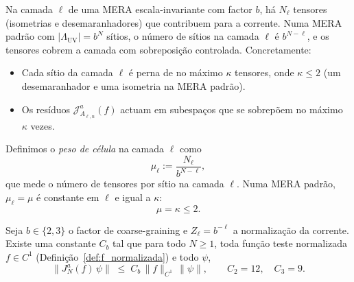 \begin{definition}\label{def:peso_celula}
Na camada $\ell$ de uma MERA escala-invariante com factor $b$, há
$N_\ell$ tensores (isometrias e desemaranhadores) que contribuem
para a corrente. Numa MERA padrão com $|\Lambda_{\mathrm{UV}}| = b^N$
sítios, o número de sítios na camada $\ell$ é $b^{N-\ell}$, e os
tensores cobrem a camada com sobreposição controlada. Concretamente:
\begin{itemize}
\item Cada sítio da camada $\ell$ é perna de no máximo $\kappa$
  tensores, onde $\kappa \le 2$ (um desemaranhador e uma isometria
  na MERA padrão).
\item Os resíduos $\mathcal{J}^a_{A_{\ell,n}}(f)$ actuam em subespaços
  que se sobrepõem no máximo $\kappa$ vezes.
\end{itemize}
Definimos o \emph{peso de célula} na camada $\ell$ como
\begin{equation}
  \mu_\ell := \frac{N_\ell}{b^{N-\ell}},
  \label{eq:def_mu_ell}
\end{equation}
que mede o número de tensores por sítio na camada $\ell$. Numa MERA
padrão, $\mu_\ell = \mu$ é constante em $\ell$ e igual a $\kappa$:
\begin{equation}
  \mu = \kappa \le 2.
  \label{eq:mu_constante}
\end{equation}
\end{definition}

\begin{lemma}\label{lem:uniforme}
Seja $b \in \{2,3\}$ o factor de coarse-graining e $Z_\ell = b^{-\ell}$
a normalização da corrente. Existe uma constante $C_b$ tal que para
todo $N \ge 1$, toda função teste normalizada $f \in C^1$
(Definição~\ref{def:f_normalizada}) e todo $\psi$,
\begin{equation}
  \bigl\|J_N^a(f)\,\psi\bigr\|
  \;\le\; C_b\,\|f\|_{C^1}\,\|\psi\|,
  \qquad
  C_2 = 12, \quad C_3 = 9.
  \label{eq:lema4}
\end{equation}
\end{lemma}

